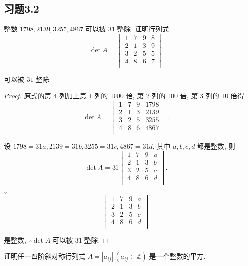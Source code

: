 \documentclass{ctexart}
\begin{document}
\subsection{习题3.2}
\begin{exercise}[2.1]
    整数 $1798,2139,3255,4867$ 可以被 $31$ 整除. 证明行列式
    \[\det A=\begin{vmatrix}
        1 & 7 & 9 & 8 \\
        2 & 1 & 3 & 9 \\
        3 & 2 & 5 & 5 \\
        4 & 8 & 6 & 7 \\
    \end{vmatrix}\]

    可以被 $31$ 整除.
\end{exercise}
\begin{proof}
    原式的第 $4$ 列加上第 $1$ 列的 $1000$ 倍, 第 $2$ 列的 $100$ 倍, 第 $3$ 列的 $10$ 倍得
    \[\det A=\begin{vmatrix}
        1 & 7 & 9 & 1798 \\
        2 & 1 & 3 & 2139 \\
        3 & 2 & 5 & 3255 \\
        4 & 8 & 6 & 4867 \\
    \end{vmatrix}.\]

    设 $1798=31a,2139=31b,3255=31c,4867=31d$, 其中 $a,b,c,d$ 都是整数, 则
    \[\det A=31\begin{vmatrix}
        1 & 7 & 9 & a \\
        2 & 1 & 3 & b \\
        3 & 2 & 5 & c \\
        4 & 8 & 6 & d \\
    \end{vmatrix}.\]

    $\because$
    \[\begin{vmatrix}
        1 & 7 & 9 & a \\
        2 & 1 & 3 & b \\
        3 & 2 & 5 & c \\
        4 & 8 & 6 & d \\
    \end{vmatrix}\]

    是整数, $\therefore\det A$ 可以被 $31$ 整除.
\end{proof}
\begin{exercise}[2.2]
    证明任一四阶斜对称行列式 $A=|a_{ij}|\ (a_{ij}\in\mathbb{Z})$ 是一个整数的平方.
\end{exercise}
\end{document}
